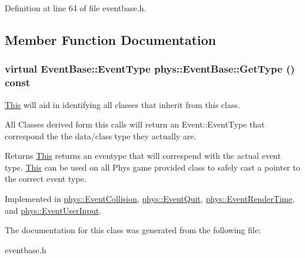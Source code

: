 Definition at line 64 of file eventbase.h.



\subsection{Member Function Documentation}
\hypertarget{classphys_1_1EventBase_a1b3d29b6ecf30f18cc3e1825a515c508}{
\subsubsection[{GetType}]{\setlength{\rightskip}{0pt plus 5cm}virtual {\bf EventBase::EventType} phys::EventBase::GetType () const}}
\label{dd/d80/classphys_1_1EventBase_a1b3d29b6ecf30f18cc3e1825a515c508}


\hyperlink{structThis}{This} will aid in identifying all classes that inherit from this class. 

All Classes derived form this calls will return an Event::EventType that correspond the the data/class type they actually are. \begin{DoxyReturn}{Returns}
\hyperlink{structThis}{This} returns an eventype that will correspend with the actual event type. \hyperlink{structThis}{This} can be used on all Phys game provided class to safely cast a pointer to the correct event type. 
\end{DoxyReturn}


Implemented in \hyperlink{classphys_1_1EventCollision_a96c2809f1bbab78b9f2758cea15a9a36}{phys::EventCollision}, \hyperlink{classphys_1_1EventQuit_a3bfca875349e73dbda47c3c62a253e3b}{phys::EventQuit}, \hyperlink{classphys_1_1EventRenderTime_a160ca55bf9e5a2ae80dab82eab88baf5}{phys::EventRenderTime}, and \hyperlink{classphys_1_1EventUserInput_a3e803a8d9bcc1576fe04d2245a86ec80}{phys::EventUserInput}.



The documentation for this class was generated from the following file:\begin{DoxyCompactItemize}
\item 
eventbase.h\end{DoxyCompactItemize}
